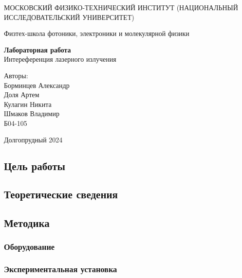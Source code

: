 \documentclass{article}
\begin{document}
\begin{titlepage}
	\begin{center}
		{\large МОСКОВСКИЙ ФИЗИКО-ТЕХНИЧЕСКИЙ ИНСТИТУТ (НАЦИОНАЛЬНЫЙ ИССЛЕДОВАТЕЛЬСКИЙ УНИВЕРСИТЕТ)}
	\end{center}
	\begin{center}
		{\large Физтех-школа фотоники, электроники и молекулярной физики}
	\end{center}


	\vspace{4.5cm}
	{\huge
		\begin{center}
			{\bf Лабораторная работа }\\
			Интереференция лазерного излучения
		\end{center}
	}
	\vspace{2cm}
	\begin{flushright}
		{\LARGE Авторы:\\ Борминцев Александр\\
			Доля Артем\\
			Кулагин Никита\\
			Шмаков Владимир \\
			\vspace{0.2cm}
			Б04-105}
	\end{flushright}
	\vspace{8cm}
	\begin{center}
		Долгопрудный 2024
	\end{center}
\end{titlepage}


\newpage


\subsection*{Цель работы}


\subsection*{Теоретические сведения}


\subsection*{Методика}

\subsubsection*{Оборудование}

\subsubsection*{Экспериментальная установка}
\end{document}

